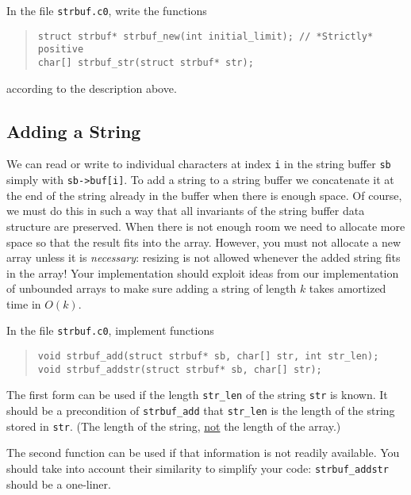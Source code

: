 \documentclass[12pt]{exam}
\begin{document}
\begin{task}[3]
  In the file \lstinline'strbuf.c0', write the functions
\begin{quote}
\begin{lstlisting}
struct strbuf* strbuf_new(int initial_limit); // *Strictly* positive
char[] strbuf_str(struct strbuf* str);
\end{lstlisting}
\end{quote}
according to the description above.
\end{task}

\subsection{Adding a String}
\label{sec:add}

We can read or write to individual characters at index \lstinline'i'
in the string buffer \lstinline'sb' simply with
\lstinline'sb->buf[i]'.  To add a string to a string buffer we
concatenate it at the end of the string already in the buffer when
there is enough space.  Of course, we must do this in such a way that
all invariants of the string buffer data structure are preserved.
When there is not enough room we need to allocate more space so that
the result fits into the array. However, you must not allocate a new
array unless it is \emph{necessary}: resizing is not allowed whenever
the added string fits in the array! Your implementation should exploit ideas
from our implementation of unbounded arrays to make sure adding a
string of length $k$ takes amortized time in $O(k)$.

\begin{task}[5]
  In the file \lstinline'strbuf.c0', implement functions
\begin{quote}
\begin{lstlisting}
void strbuf_add(struct strbuf* sb, char[] str, int str_len);
void strbuf_addstr(struct strbuf* sb, char[] str);
\end{lstlisting}
\end{quote}
The first form can be used if the length \lstinline'str_len' of the
string \lstinline'str' is known. It should be a precondition of
\lstinline'strbuf_add' that \lstinline'str_len' is the length of the
string stored in \lstinline'str'. (The length of the string,
\underline{not} the length of the array.)

The second function can be used if that information is not readily
available. You should take into account their similarity to simplify
your code: \lstinline'strbuf_addstr' should be a one-liner.
\end{task}
\end{document}
